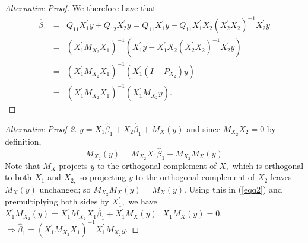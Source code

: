 \documentclass[notes=show]{beamer}
\begin{document}
\begin{frame}%

\begin{proof}[Alternative Proof]
We therefore have that 
\begin{eqnarray*}
\hat{\beta}_{1} &=&Q_{11}X_{1}^{\prime }y+Q_{12}X_{2}^{\prime
}y=Q_{11}X_{1}^{\prime }y-Q_{11}X_{1}^{\prime }X_{2}\left( X_{2}^{\prime
}X_{2}\right) ^{-1}X_{2}^{\prime }y \\
&=&\left( X_{1}^{\prime }M_{X_{2}}X_{1}\right) ^{-1}\left( X_{1}^{\prime
}y-X_{1}^{\prime }X_{2}\left( X_{2}^{\prime }X_{2}\right) ^{-1}X_{2}^{\prime
}y\right)  \\
&=&\left( X_{1}^{\prime }M_{X_{2}}X_{1}\right) ^{-1}\left( X_{1}^{\prime
}\left( I-P_{X_{2}}\right) y\right)  \\
&=&\left( X_{1}^{\prime }M_{X_{2}}X_{1}\right) ^{-1}\left( X_{1}^{\prime
}M_{X_{2}}y\right) .
\end{eqnarray*}
\end{proof}

\end{frame}%

\begin{frame}%

\begin{proof}[Alternative Proof 2]
$y=X_{1}\widehat{\beta }_{1}+X_{2}\widehat{\beta }_{1}+M_{X}(y)$ and since $%
M_{X_{2}}X_{2}=0$ by definition,%
\begin{equation}
M_{X_{2}}(y)=M_{X_{2}}X_{1}\widehat{\beta }_{1}+M_{X_{2}}M_{X}(y)
\label{eqq2}
\end{equation}%
Note that $M_{X}$ projects $y$ to the orthogonal complement of $X,$ which is
orthogonal to both $X_{1}$ and $X_{2,}$ so projecting $y$ to the orthogonal
complement of $X_{2}$ leaves $M_{X}(y)$ unchanged; so $%
M_{X_{2}}M_{X}(y)=M_{X}(y).$ Using this in (\ref{eqq2}) and premultiplying
both sides by $X_{1}^{\prime },$ we have $X_{1}^{\prime
}M_{X_{2}}(y)=X_{1}^{\prime }M_{X_{2}}X_{1}\widehat{\beta }%
_{1}+X_{1}^{\prime }M_{X}(y).$ $X_{1}^{\prime }M_{X}(y)=0,$ $\Rightarrow 
\widehat{\beta }_{1}=(X_{1}^{\prime }M_{X_{2}}X_{1})^{-1}X_{1}^{\prime
}M_{X_{2}}y.$
\end{proof}

\end{frame}%
\end{document}

